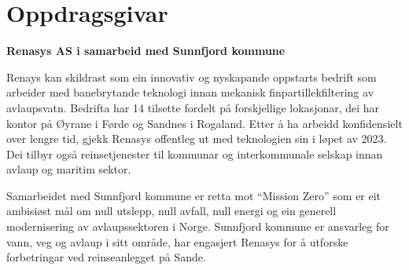 \section{Oppdragsgivar}
\textbf{Renasys AS i samarbeid med Sunnfjord kommune}

Renays\citep{Renasys} kan skildrast som ein innovativ og nyskapande oppstarts bedrift som arbeider med banebrytande teknologi innan mekanisk finpartillekfiltering av avlaupsvatn.
Bedrifta har 14 tilsette fordelt på forskjellige lokasjonar, dei har kontor på Øyrane i Førde og Sandnes i Rogaland. 
Etter å ha arbeidd konfidensielt over lengre tid, gjekk Renasys offentleg ut med teknologien sin i løpet av 2023. 
Dei tilbyr også reinsetjenester til kommunar og interkommunale selskap innan avlaup og maritim sektor.

Samarbeidet med Sunnfjord kommune\citep{SunnfjordKommune} er retta mot ``Mission Zero'' som er eit ambisiøst mål om 
null utslepp, null avfall, null energi og ein generell modernisering av avlaupssektoren i Norge.
Sunnfjord kommune er ansvarleg for vann, veg og avlaup i sitt område, har engasjert 
Renasys for å utforske forbetringar ved reinseanlegget på Sande.
\newline
\newline


